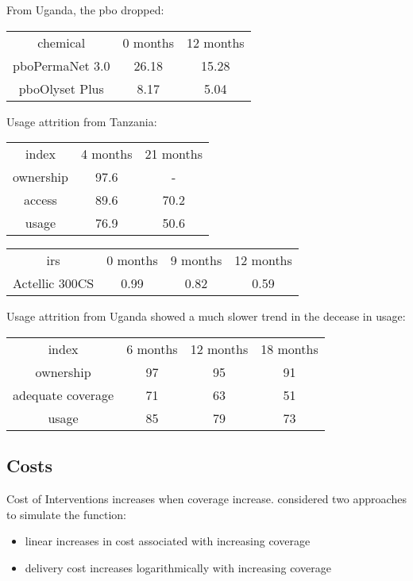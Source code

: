 \documentclass[a4paper, 12pt, twoside]{article}
\begin{document}
From Uganda\cite{Staedke2020}, the \gls{pbo} dropped:
\begin{center}
\begin{tabular}{ c c c }
  chemical & 0 months & 12 months\\ 
  \gls{pbo}PermaNet 3.0 & 26.18 & 15.28\\  
  \gls{pbo}Olyset Plus & 8.17 & 5.04\\  
\end{tabular}
\end{center}

Usage attrition from Tanzania\cite{Protopopoff2018}:

\begin{center}
\begin{tabular}{ c c c }
  index & 4 months & 21 months\\ 
  ownership & 97.6 & - \\  
  access & 89.6 & 70.2\\
  usage & 76.9 & 50.6
\end{tabular}
\end{center}

\begin{center}
\begin{tabular}{ c c c c }
  \gls{irs} & 0 months & 9 months & 12 months\\ 
  Actellic 300CS & 0.99 & 0.82 & 0.59  \\  
\end{tabular}
\end{center}

Usage attrition from Uganda\cite{Staedke2020} showed a much slower trend in the decease in usage:

\begin{center}
\begin{tabular}{ c c c c }
  index & 6 months & 12 months & 18 months\\ 
  ownership & 97 & 95 & 91 \\  
  adequate coverage & 71 & 63 & 51\\
  usage & 85 & 79 & 73
\end{tabular}
\end{center}

\subsection{Costs}
Cost of Interventions increases when coverage increase. \cite{Winskill2017a} considered two approaches to simulate the function:
\begin{itemize}
	\item linear increases in cost associated with increasing coverage
	\item delivery cost increases logarithmically with increasing coverage
\end{itemize}
\end{document}
